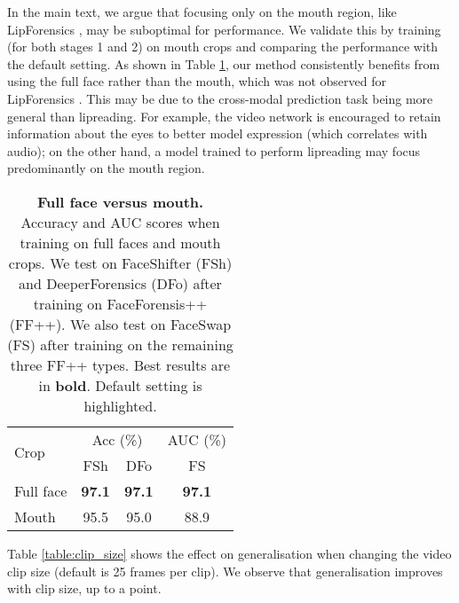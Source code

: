 \documentclass[10pt,twocolumn,letterpaper]{article}
\begin{document}
\begin{description}[wide,itemindent=\labelsep]
\item[Full face versus mouth.] In the main text, we argue that focusing only on the mouth region, like LipForensics \cite{haliassos2021lips}, may be suboptimal for performance. We validate this by training (for both stages 1 and 2) on mouth crops and comparing the performance with the default setting. As shown in Table \ref{table:fullface_vs_mouth}, our method consistently benefits from using the full face rather than the mouth, which was not observed for LipForensics \cite{haliassossupplementary}. This may be due to the cross-modal prediction task being more general than lipreading. For example, the video network is encouraged to retain information about the eyes to better model expression (which correlates with audio); on the other hand, a model trained to perform lipreading may focus predominantly on the mouth region.

\begin{table}
\begin{center}
\begin{tabular}{l c c c}\toprule
\multirow{2}{*}{Crop} & \multicolumn{2}{c}{Acc (\%)} & AUC (\%) \\  
 \cmidrule(lr){2-3} \cmidrule(lr){4-4}
 & FSh & DFo & FS \\ \midrule
\rowcolor{light-gray}
Full face & \textbf{97.1} & \textbf{97.1} & \textbf{97.1} \\
Mouth & 95.5 & 95.0 & 88.9 \\ \bottomrule
\end{tabular}
\end{center}
\caption{\textbf{Full face versus mouth.} Accuracy and AUC scores when training on full faces and mouth crops. We test on FaceShifter (FSh) and DeeperForensics (DFo) after training on FaceForensis++ (FF++). We also test on FaceSwap (FS) after training on the remaining three FF++ types. Best results are in \textbf{bold}. Default setting is \colorbox{light-gray}{highlighted}.}
\label{table:fullface_vs_mouth}
\end{table}

\item[Effect of clip size.] Table \ref{table:clip_size} shows the effect on generalisation when changing the video clip size (default is 25 frames per clip). We observe that generalisation improves with clip size, up to a point.


\end{description}
\end{document}
